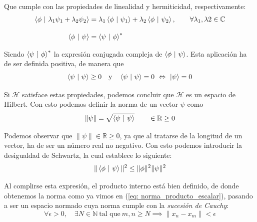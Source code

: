 \documentclass{article}
\numberwithin{equation}{section} %
\begin{document}
    \vspace{1.5mm}

    Que cumple con las propiedades de linealidad y hermiticidad, respectivamente:
    \begin{align*}
        \braket{\phi \ | \ \lambda_{1}\psi_{1} + \lambda_{2}\psi_{2}} &= \lambda_{1} \braket{\phi \ | \ \psi_{1}} + \lambda_{2} \braket{\phi \ | \ \psi_{2}}, \qquad \forall \lambda_{1}, \lambda{2} \in \mathbb{C} \\[10pt]
        \braket{\phi \ | \ \psi} &= \braket{\psi \ | \ \phi}^{*}
    \end{align*}

    \vspace{1.5mm}

    Siendo \( \braket{\psi \ | \ \phi}^{*} \) la expresión conjugada compleja de \( \braket{\phi \ | \ \psi} \). Esta aplicación ha de ser definida positiva, de manera que
    \begin{equation*}
        \braket{\psi \ | \ \psi} \geq 0 \quad \text{y} \quad \braket{\psi \ | \ \psi} = 0 \ \Leftrightarrow \ \ket{\psi} = 0
    \end{equation*}

    \vspace{1.5mm}

    Si \( \mathcal{H} \) satisface estas propiedades, podemos concluir que \( \mathcal{H} \) es un espacio de Hilbert. Con esto podemos definir la norma de un vector \( \psi \) como
    \begin{equation}
        \| \psi \| = \sqrt{\braket{\psi \ | \ \psi}} \qquad \in \mathbb{R} \geq 0
        \label{eq: norma_producto_escalar}
    \end{equation}

    \vspace{1.5mm}

    Podemos observar que \( \| \psi \| \in \mathbb{R} \geq 0 \), ya que al tratarse de la longitud de un vector, ha de ser un número real no negativo. Con esto podemos introducir la desigualdad de Schwartz, la cual establece lo siguiente:
    \begin{equation}
        \| \braket{\phi \ | \ \psi} \| ^{2} \leq \| \phi \| ^{2} \| \psi \|^{2}
        \label{eq: desigualdad_schwartz}
    \end{equation}

    \vspace{1.5mm}

    Al complirse esta expresión, el producto interno está bien definido, de donde obtenemos la norma como ya vimos en (\ref{eq: norma_producto_escalar}), pasando a ser un espacio normado cuya norma cumple con la \textit{sucesión de Cauchy}:
    \begin{equation*}
        \forall \epsilon > 0, \quad \exists N \in \mathbb{N} \ \text{tal que} \ m, n \geq N \implies \| x_{n} - x_{m} \| < \epsilon
    \end{equation*}
    
\end{document}
